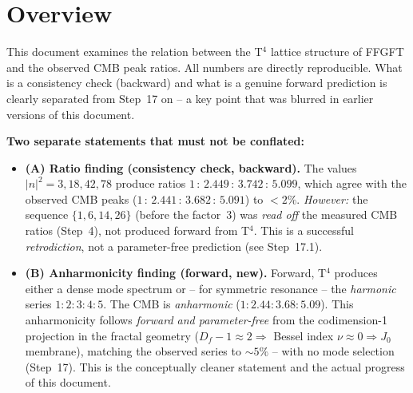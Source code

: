 %
%

\section*{Overview}

This document examines the relation between the T$^4$ lattice structure of
FFGFT and the observed CMB peak ratios. All numbers are directly
reproducible. What is a consistency check (backward) and what is a genuine
forward prediction is clearly separated from Step~17 on -- a key point that
was blurred in earlier versions of this document.

\textbf{Two separate statements that must not be conflated:}
\begin{itemize}
  \item \textbf{(A) Ratio finding (consistency check, backward).}
        The values $|n|^2 = 3, 18, 42, 78$ produce ratios
        $1\,:\,2{.}449\,:\,3{.}742\,:\,5{.}099$, which agree with the observed
        CMB peaks ($1\,:\,2{.}441\,:\,3{.}682\,:\,5{.}091$) to $<2\%$.
        \emph{However:} the sequence $\{1,6,14,26\}$ (before the factor~3) was
        \emph{read off} the measured CMB ratios (Step~4), not produced forward
        from T$^4$. This is a successful \emph{retrodiction}, not a
        parameter-free prediction (see Step~17.1).
  \item \textbf{(B) Anharmonicity finding (forward, new).}
        Forward, T$^4$ produces either a dense mode spectrum or -- for
        symmetric resonance -- the \emph{harmonic} series $1:2:3:4:5$. The CMB
        is \emph{anharmonic} ($1:2{.}44:3{.}68:5{.}09$). This anharmonicity
        follows \emph{forward and parameter-free} from the codimension-1
        projection in the fractal geometry ($D_f-1 \approx 2 \Rightarrow$
        Bessel index $\nu\approx0 \Rightarrow J_0$ membrane), matching the
        observed series to $\sim5\%$ -- with no mode selection (Step~17). This
        is the conceptually cleaner statement and the actual progress of this
        document.
\end{itemize}

